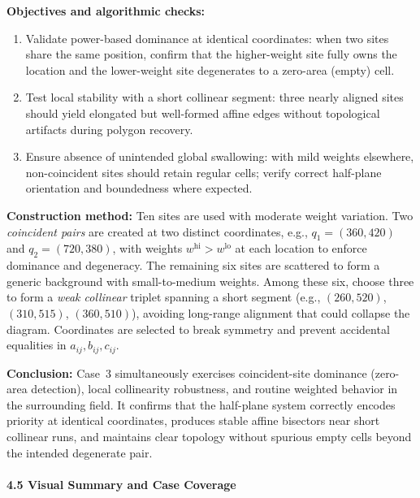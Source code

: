 \documentclass{article}
\begin{document}
\textbf{Objectives and algorithmic checks:}
\begin{enumerate}
    \item Validate power-based dominance at identical coordinates: when two sites share the same position, confirm that the higher-weight site fully owns the location and the lower-weight site degenerates to a zero-area (empty) cell.
    \item Test local stability with a short collinear segment: three nearly aligned sites should yield elongated but well-formed affine edges without topological artifacts during polygon recovery.
    \item Ensure absence of unintended global swallowing: with mild weights elsewhere, non-coincident sites should retain regular cells; verify correct half-plane orientation and boundedness where expected.
\end{enumerate}

\textbf{Construction method:}
Ten sites are used with moderate weight variation. Two \emph{coincident pairs} are created at two distinct coordinates, e.g., $q_1=(360,420)$ and $q_2=(720,380)$, with weights $w^\text{hi}>w^\text{lo}$ at each location to enforce dominance and degeneracy. The remaining six sites are scattered to form a generic background with small-to-medium weights. Among these six, choose three to form a \emph{weak collinear} triplet spanning a short segment (e.g., $(260,520)$, $(310,515)$, $(360,510)$), avoiding long-range alignment that could collapse the diagram. Coordinates are selected to break symmetry and prevent accidental equalities in $a_{ij},b_{ij},c_{ij}$.

\textbf{Conclusion:}
Case~3 simultaneously exercises coincident-site dominance (zero-area detection), local collinearity robustness, and routine weighted behavior in the surrounding field. It confirms that the half-plane system correctly encodes priority at identical coordinates, produces stable affine bisectors near short collinear runs, and maintains clear topology without spurious empty cells beyond the intended degenerate pair.

\paragraph{4.5 Visual Summary and Case Coverage}\
\end{document}
